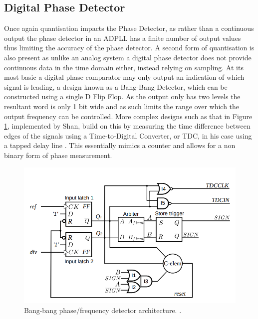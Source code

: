\documentclass[11pt,english,british]{report}
\begin{document}
\subsection{Digital Phase Detector}
Once again quantisation impacts the Phase Detector, as rather than a continuous output the phase detector in an ADPLL has a finite number of output values thus limiting the accuracy of the phase detector. A second form of quantisation is also present as unlike an analog system a digital phase detector does not provide continuous data in the time domain either, instead relying on sampling. At its most basic a digital phase comparator may only output an indication of which signal is leading, a design known as a Bang-Bang Detector, which can be constructed using a single D Flip Flop. As the output only has two levels the resultant word is only 1 bit wide and as such limits the range over which the output frequency can be controlled. More complex designs such as that in Figure \ref{fig:shan_bb_pd}, implemented by Shan, build on this by measuring the time difference between edges of the signals using a Time-to-Digital Converter, or TDC, in his case using a tapped delay line \cite{shan2014phd}. This essentially mimics a counter and allows for a non binary form of phase measurement.

\begin{figure}[h] %
	\centering
	\includegraphics[scale=0.35]{../shan_bb_pd}
	\caption{Bang-bang phase/frequency detector architecture. \cite{shan2014phd}.}
	\label{fig:shan_bb_pd}
\end{figure}
\end{document}
